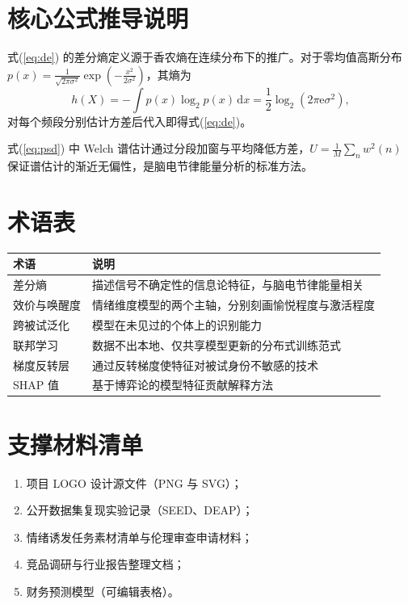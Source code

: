 \documentclass[zihao=-4,fontset=windows,a4paper]{ctexart}
\begin{document}
\section{核心公式推导说明}

式(\ref{eq:de}) 的差分熵定义源于香农熵在连续分布下的推广。对于零均值高斯分布 $p(x)=\frac{1}{\sqrt{2\pi\sigma^2}}\exp(-\frac{x^2}{2\sigma^2})$，其熵为
\begin{equation}
h(X)=-\int p(x)\log_2 p(x)\,\mathrm{d}x
=\frac{1}{2}\log_2\left(2\pi\mathrm{e}\sigma^2\right),
\label{eq:de_derive}
\end{equation}
对每个频段分别估计方差后代入即得式(\ref{eq:de})。

式(\ref{eq:psd}) 中 Welch 谱估计通过分段加窗与平均降低方差，$U=\frac{1}{M}\sum_n w^2(n)$ 保证谱估计的渐近无偏性，是脑电节律能量分析的标准方法。

\section{术语表}

\begin{tabular}{p{3.2cm}p{10.6cm}}
\toprule
\textbf{术语} & \textbf{说明} \\
\midrule
差分熵 & 描述信号不确定性的信息论特征，与脑电节律能量相关 \\
效价与唤醒度 & 情绪维度模型的两个主轴，分别刻画愉悦程度与激活程度 \\
跨被试泛化 & 模型在未见过的个体上的识别能力 \\
联邦学习 & 数据不出本地、仅共享模型更新的分布式训练范式 \\
梯度反转层 & 通过反转梯度使特征对被试身份不敏感的技术 \\
SHAP 值 & 基于博弈论的模型特征贡献解释方法 \\
\bottomrule
\end{tabular}

\section{支撑材料清单}

\begin{enumerate}
  \item 项目 LOGO 设计源文件（PNG 与 SVG）；
  \item 公开数据集复现实验记录（SEED、DEAP）；
  \item 情绪诱发任务素材清单与伦理审查申请材料；
  \item 竞品调研与行业报告整理文档；
  \item 财务预测模型（可编辑表格）。
\end{enumerate}
\end{document}
